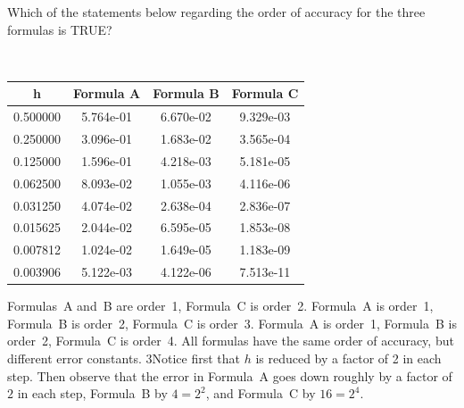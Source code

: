 \documentclass[10pt]{article}
\makeatletter
\newcounter{totalQ}\setcounter{totalQ}{1}
\newcounter{totalMC}\setcounter{totalMC}{0}
\newcounter{Acount}\setcounter{Acount}{0}
\newcounter{Bcount}\setcounter{Bcount}{0}
\newcounter{Ccount}\setcounter{Ccount}{0}
\newcounter{Dcount}\setcounter{Dcount}{0}
\newcommand{\mysecnum}{0}
\newlength{\mycoltwosize} %
\newcommand{\mytwocol}[3][0.45]{%
  \setlength{\mycoltwosize}{0.90\textwidth-#1\textwidth}
  \mbox{}\begin{minipage}[t]{{#1}\textwidth}
    #2
  \end{minipage}
  \qquad %
  \begin{minipage}[t]{\mycoltwosize}
    \vspace*{0pt}
    #3
  \end{minipage}}
\newenvironment{clicklist}{%
  \begin{enumerate}
    \renewcommand{\labelenumi}{{\sffamily\bfseries Q{\mysecnum}--\arabic{enumi}.}}
    \renewcommand{\labelenumi}{{\sffamily\bfseries Q{\mysecnum}--\arabic{enumi}${}^\text{\arabic{totalQ}}$.}}
    \setlength{\itemindent}{\widthof{Q}+\labelsep}
  }{%
  \end{enumerate}}
\newcommand{\qitemMCfour}[8]{\item #1 
  \begin{ABClist}
  \item #2
  \item #3
  \item #4
  \item #5
  \end{ABClist}
  \ifthenelse{\boolean{@IsSolutionPrinted}}{\emph{Answer:~~(\AlphAlph{#6}).~~~~#7}}{}%
  \ifsource{#8}
  \stepcounter{totalQ}\stepcounter{totalMC}
  \ifthenelse{#6=1}{\stepcounter{Acount}}{%
    \ifthenelse{#6=2}{\stepcounter{Bcount}}{%
      \ifthenelse{#6=3}{\stepcounter{Ccount}}{%
        \ifthenelse{#6=4}{\stepcounter{Dcount}}{}}}}
}
\makeatother
\begin{document}
\begin{clicklist}
{{      Which of the statements below regarding the order of
      accuracy for the three formulas is TRUE?}%
    {%
      {\tt\small
        \begin{tabular}{c|ccc}
          h & Formula A & Formula B & Formula C\\\hline
          0.500000 & 5.764e-01 & 6.670e-02 & 9.329e-03\\
          0.250000 & 3.096e-01 & 1.683e-02 & 3.565e-04\\
          0.125000 & 1.596e-01 & 4.218e-03 & 5.181e-05\\
          0.062500 & 8.093e-02 & 1.055e-03 & 4.116e-06\\
          0.031250 & 4.074e-02 & 2.638e-04 & 2.836e-07\\
          0.015625 & 2.044e-02 & 6.595e-05 & 1.853e-08\\
          0.007812 & 1.024e-02 & 1.649e-05 & 1.183e-09\\
          0.003906 & 5.122e-03 & 4.122e-06 & 7.513e-11
        \end{tabular}}}}%
  {Formulas~A and~B are order~1, Formula~C is order~2.}%
  {Formula~A is order~1, Formula~B is order~2, Formula~C is order~3.}%
  {Formula~A is order~1, Formula~B is order~2, Formula~C is order~4.}%
  {All formulas have the same order of accuracy, but different error
    constants.}%
  {3}{Notice first that $h$ is reduced by a factor of 2 in each step.
    Then observe that the error in Formula~A goes down roughly by a
    factor of $2$ in each step, Formula~B by $4=2^2$, and Formula~C by
    $16=2^4$.}{\jms}


\end{clicklist}
\end{document}
